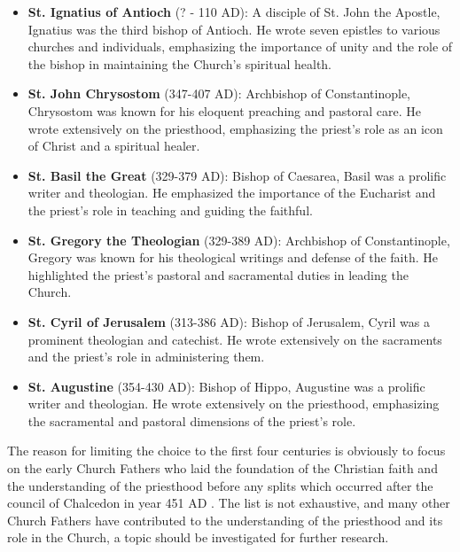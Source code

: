 \documentclass[12pt,doc]{apa7}   	%
\begin{document}
\begin{itemize}
    \item \textbf{St. Ignatius of Antioch} (? - 110 AD): A disciple of St. John the Apostle, Ignatius was the third bishop of Antioch. He wrote seven epistles to various churches and individuals, emphasizing the importance of unity and the role of the bishop in maintaining the Church’s spiritual health.
    \item \textbf{St. John Chrysostom} (347-407 AD): Archbishop of Constantinople, Chrysostom was known for his eloquent preaching and pastoral care. He wrote extensively on the priesthood, emphasizing the priest’s role as an icon of Christ and a spiritual healer.
    \item \textbf{St. Basil the Great} (329-379 AD): Bishop of Caesarea, Basil was a prolific writer and theologian. He emphasized the importance of the Eucharist and the priest’s role in teaching and guiding the faithful.
    \item \textbf{St. Gregory the Theologian} (329-389 AD): Archbishop of Constantinople, Gregory was known for his theological writings and defense of the faith. He highlighted the priest’s pastoral and sacramental duties in leading the Church.
    \item \textbf{St. Cyril of Jerusalem} (313-386 AD): Bishop of Jerusalem, Cyril was a prominent theologian and catechist. He wrote extensively on the sacraments and the priest’s role in administering them.
    \item \textbf{St. Augustine} (354-430 AD): Bishop of Hippo, Augustine was a prolific writer and theologian. He wrote extensively on the priesthood, emphasizing the sacramental and pastoral dimensions of the priest’s role.
\end{itemize}
    

The reason for limiting the choice to the first four centuries is obviously to focus on the early Church Fathers who laid the foundation of the Christian faith and the understanding of the priesthood before any splits which occurred after the  council of Chalcedon in year 451 AD \citep{early_church_akin}.  The list is not exhaustive, and many other Church Fathers have contributed to the understanding of the priesthood and its role in the Church, a topic should be investigated for further research.
\end{document}
